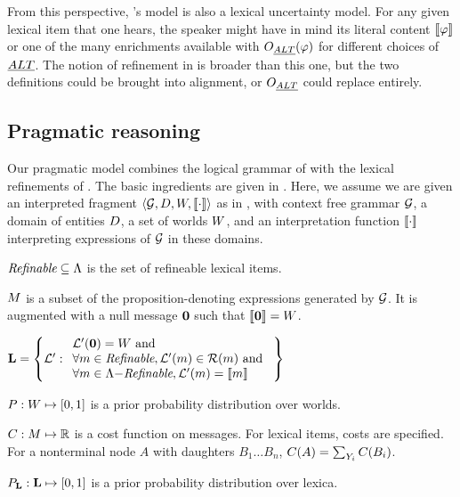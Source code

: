 \documentclass[leqno]{article}
\begin{document}
From this perspective, \CFS's model is also a lexical uncertainty
model. For any given lexical item that one hears, the speaker might
have in mind its literal content $\llbracket\varphi\rrbracket$ or one of the many
enrichments available with $O_{\emph{ALT}}(\varphi)$ for different choices
of $\emph{ALT}$. The notion of refinement in  is broader than
this one, but the two definitions could be brought into alignment, or
$O_{\emph{ALT}}$ could replace  entirely.


\subsection{Pragmatic reasoning}\label{sec:agents}

Our pragmatic model combines the logical grammar of
 with the lexical refinements of
. The basic ingredients are given in
. Here, we assume we are given an interpreted fragment
$\langle \mathcal{G}, D, W, \llbracket\cdot\rrbracket \rangle$ as in
, with context free grammar $\mathcal{G}$, a domain
of entities $D$, a set of worlds $W$, and an
interpretation function $\llbracket\cdot\rrbracket$ interpreting expressions of
$\mathcal{G}$ in these domains.
%
\begin{examples}
\item\label{modobjects}
  \begin{examples}
  \item\label{refineable} $\textit{Refinable} \subseteq \Lambda$ is the set of
    refineable lexical items.

  \item\label{messages} $M$ is a subset of the
    proposition-denoting expressions generated by $\mathcal{G}$. It is
    augmented with a null message $\mathbf{0}$ such that $\llbracket\mathbf{0}\rrbracket
    = W$.

  \item\label{lexset}%
    $\mathbf{L} = \left\{ \mathcal{L}' :       
      \begin{array}[c]{l}
        \mathcal{L}'(\mathbf{0}) = W \text{ and } \\ 
        \forall m \in \textit{Refinable}, \mathcal{L}'(m) \in \mathcal{R}(m) \text{ and } \\
        \forall m \in \Lambda{-}\textit{Refinable}, \mathcal{L}'(m) = \llbracket m\rrbracket
      \end{array} \right\}$
  
  \item $P : W \mapsto [0,1]$ is a prior probability
    distribution over worlds.

  \item $C : M \mapsto \mathbb{R}$ is a cost function on
    messages.  For lexical items, costs are specified. For a
    nonterminal node $A$ with daughters $B_{1} \ldots B_{n}$,
    $C(A) = \sum_{Y_{i}}C(B_{i})$.

  \item $P_{\mathbf{L}} : \mathbf{L} \mapsto [0,1]$ is a prior probability
    distribution over lexica.
  \end{examples}
\end{examples}
\end{document}
